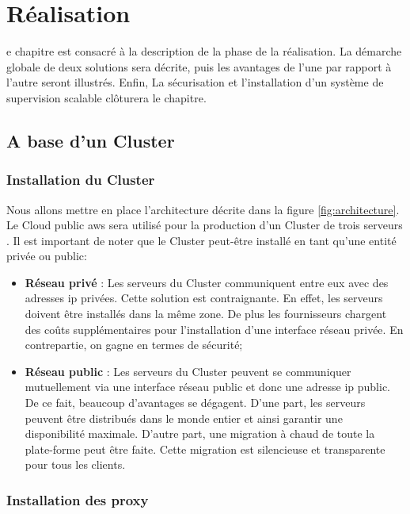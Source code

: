 \chapter{Réalisation}
\begin{onehalfspace}

e chapitre est consacré à la description de la phase de la réalisation. La démarche globale de deux solutions sera décrite, puis les avantages de l'une par rapport à l'autre seront illustrés. Enfin, La sécurisation et l'installation d'un système de supervision scalable clôturera le chapitre.

\newpage

\section{A base d'un Cluster}

\subsection{Installation du Cluster}

Nous allons mettre en place l'architecture décrite dans la figure \ref{fig:architecture}. Le Cloud public \acrshort{aws} sera utilisé pour la production d'un Cluster de trois serveurs \cite{coreos-aws}. Il est important de noter que le Cluster peut-être installé en tant qu'une entité privée ou public:


\begin{itemize}
	\item \textbf{Réseau privé} : Les serveurs du Cluster communiquent entre eux avec des adresses \acrshort{ip} privées. Cette solution est contraignante. En effet, les serveurs doivent être installés dans la même zone. De plus les fournisseurs chargent des coûts supplémentaires pour l'installation d'une interface réseau privée. En contrepartie, on gagne en termes de sécurité;
	\item \textbf{Réseau public} : Les serveurs du Cluster peuvent se communiquer mutuellement via une interface réseau public et donc une adresse \acrshort{ip} public. De ce fait, beaucoup d'avantages se dégagent. D'une part, les serveurs peuvent être distribués dans le monde entier et ainsi garantir une disponibilité maximale. D'autre part, une migration à chaud de toute la plate-forme peut être faite. Cette migration est silencieuse et transparente pour tous les clients.
\end{itemize}

\subsection{Installation des proxy}


\end{onehalfspace}
